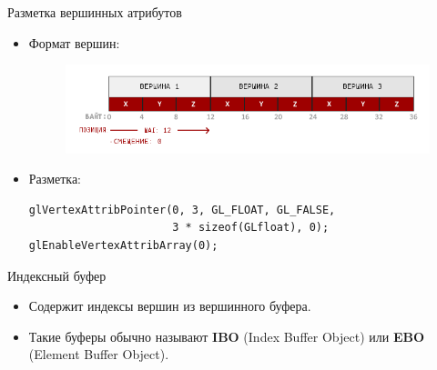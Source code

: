 \documentclass[aspectration=1610,t]{beamer}
\begin{document}
\begin{frame}[fragile]{Разметка вершинных атрибутов}
    \begin{itemize}
        \item Формат вершин:
            \begin{figure}[htp]
                \centering
                \includegraphics[scale=0.45]{res/vertex_attributes}
            \end{figure}
        \item Разметка:
            {\small \begin{lstlisting}
glVertexAttribPointer(0, 3, GL_FLOAT, GL_FALSE,
                      3 * sizeof(GLfloat), 0);
glEnableVertexAttribArray(0);
            \end{lstlisting}}
    \end{itemize}
\end{frame}


\begin{frame}[fragile]{Индексный буфер}
    \begin{itemize}
        \item Содержит индексы вершин из вершинного буфера.
        \item Такие буферы обычно называют {\bf IBO} (Index Buffer Object) 
            или {\bf EBO} (Element Buffer Object).
    \end{itemize}
\end{frame}
\end{document}
